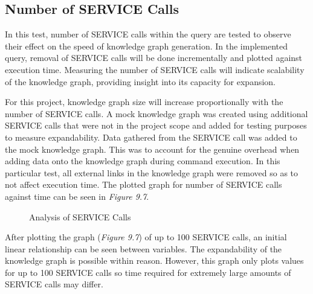 \subsection{Number of SERVICE Calls}
\hspace{0.5cm} In this test, number of SERVICE calls within the query are tested to observe their effect on the speed of knowledge graph generation. In the implemented query, removal of SERVICE calls will be done incrementally and plotted against execution time. Measuring the number of SERVICE calls will indicate scalability of the knowledge graph, providing insight into its capacity for expansion.

For this project, knowledge graph size will increase proportionally with the number of SERVICE calls. A mock knowledge graph was created using additional SERVICE calls that were not in the project scope and added for testing purposes to measure expandability. Data gathered from the SERVICE call was added to the mock knowledge graph. This was to account for the genuine overhead when adding data onto the knowledge graph during command execution. In this particular test, all external links in the knowledge graph were removed so as to not affect execution time. The plotted graph for number of SERVICE calls against time can be seen in \textit{Figure 9.7}.

\begin{figure}[H]
\begin{center}
\end{center}
\vspace{-0.75cm}
\caption{Analysis of SERVICE Calls}
\end{figure}

After plotting the graph (\textit{Figure 9.7}) of up to 100 SERVICE calls, an initial linear relationship can be seen between variables. The expandability of the knowledge graph is possible within reason. However, this graph only plots values for up to 100 SERVICE calls so time required for extremely large amounts of SERVICE calls may differ. 
